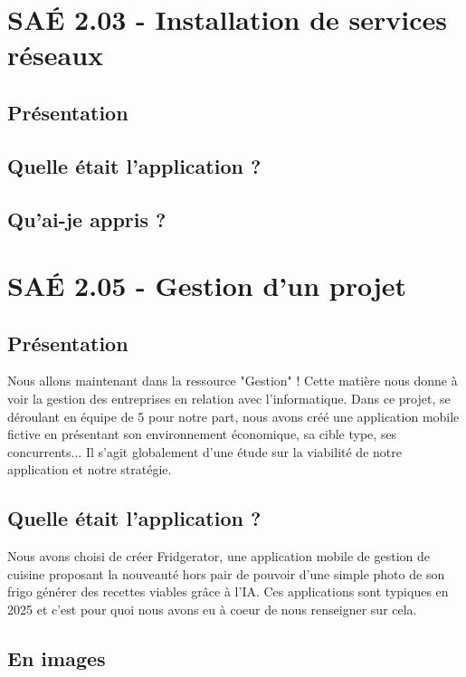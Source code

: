 \documentclass{mytex}
\begin{document}
\section{SAÉ 2.03 - Installation de services réseaux}

\subsection{Présentation}

\subsection{Quelle était l'application ?}

\subsection{Qu'ai-je appris ?}

\section{SAÉ 2.05 - Gestion d'un projet}

\subsection{Présentation}

Nous allons maintenant dans la ressource "Gestion" ! Cette matière nous donne à voir la gestion des entreprises en relation avec l'informatique. Dans ce projet, se déroulant en équipe de 5 pour notre part, nous avons créé une application mobile fictive en présentant son environnement économique, sa cible type, ses concurrents... Il s'agit globalement d'une étude sur la viabilité de notre application et notre stratégie.

\subsection{Quelle était l'application ?}

Nous avons choisi de créer Fridgerator, une application mobile de gestion de cuisine proposant la nouveauté hors pair de pouvoir d'une simple photo de son frigo générer des recettes viables grâce à l'IA. Ces applications sont typiques en 2025 et c'est pour quoi nous avons eu à coeur de nous renseigner sur cela.

\subsection{En images}
\end{document}
